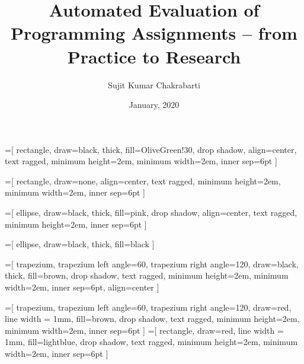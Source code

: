 \documentclass{beamer}
\title[Sujit]{Automated Evaluation of Programming Assignments -- from Practice to Research}
\author{Sujit Kumar Chakrabarti}
\institute{IIITB}
\date{January, 2020}
\begin{document}

\maketitle

\newcommand{\highlight}[1]{{\color{Red}(#1)}}

\newcommand{\myheader}[1]{
	{\color{darkblue}
		\begin{Large}
			\begin{center}
				{#1}
			\end{center}
		\end{Large}
	}
}
\newcommand{\myminorheader}[1]{
	{\color{BrickRed}
		\begin{Large}
			{\fontfamily{\sfdefault}\selectfont\textbf{#1}}
		\end{Large}
	}
}



=[%
      rectangle, draw=black, thick, fill=OliveGreen!30, drop shadow, align=center,
      text ragged, minimum height=2em, minimum width=2em, inner sep=6pt
]

=[%
      rectangle, draw=none,  align=center,
      text ragged, minimum height=2em, minimum width=2em, inner sep=6pt
]

=[%
      ellipse, draw=black, thick, fill=pink, drop shadow, align=center,
      text ragged, minimum height=2em, inner sep=6pt
]

=[%
      ellipse, draw=black, thick, fill=black
]

=[%
      trapezium, trapezium left angle=60, trapezium right angle=120, draw=black, thick, fill=brown, drop shadow,
      text ragged, minimum height=2em, minimum width=2em, inner sep=6pt, align=center
]

=[%
      trapezium, trapezium left angle=60, trapezium right angle=120, draw=red, line width = 1mm, fill=brown, drop shadow,
      text ragged, minimum height=2em, minimum width=2em, inner sep=6pt
]
=[%
      rectangle, draw=red, line width = 1mm, fill=lightblue, drop shadow,
      text ragged, minimum height=2em, minimum width=2em, inner sep=6pt
]
\end{document}
